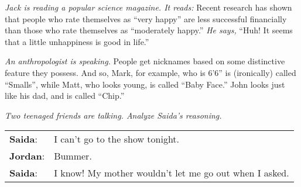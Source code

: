 {\begin{exercises}
{}{\vspace{1.5in}}



\item \textit{Jack is reading a popular science magazine. It reads: }Recent research has shown that people who rate themselves as ``very happy'' are less successful financially than those who rate themselves as ``moderately happy.'' \textit{He says,} ``Huh! It seems that a little unhappiness is good in life.''  



\item \textit{An anthropologist is speaking. }People get nicknames based on some distinctive feature they possess. And so, Mark, for example, who is 6'6'' is  (ironically) called ``Smalls'', while Matt, who looks young, is called ``Baby Face.'' John looks just like his dad, and is called ``Chip.'' 





\item \textit{Two teenaged friends are talking. Analyze Saida's reasoning.}
\vspace{-6pt}
\begin{adjustwidth}{2em}{0em}
\begin{longtabu}{p{.1\linewidth}p{.8\linewidth}}
\textbf{Saida}: &I can't go to the show tonight. \\
\textbf{Jordan}:& Bummer. \\
\textbf{Saida}: &I know! My mother wouldn't let me go out when I asked. 
\end{longtabu}
\end{adjustwidth}
\vspace{-.9cm}


\end{exercises}}
